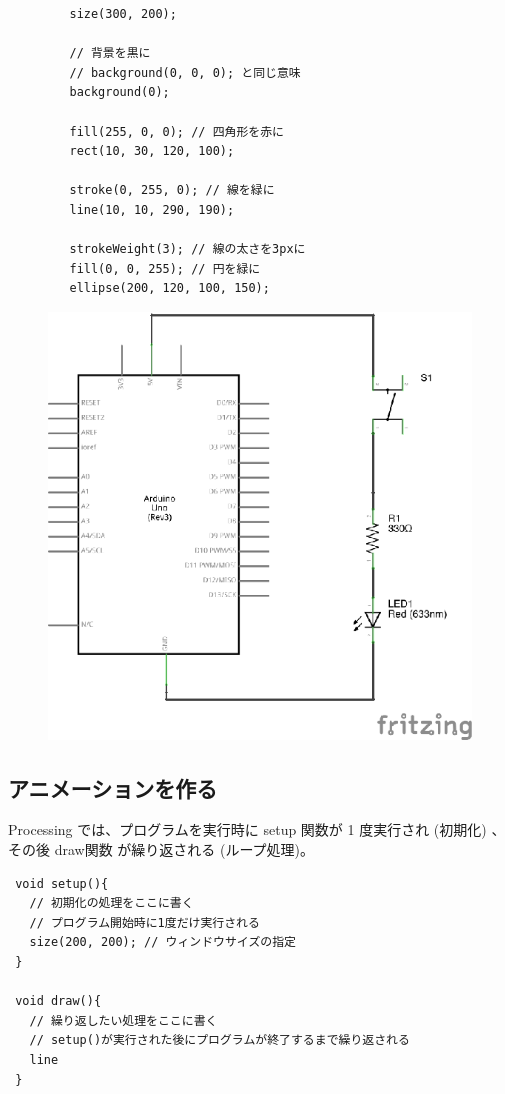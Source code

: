\documentclass[11pt,a4paper]{jarticle}
\begin{document}
\begin{figure}[h!]
 \begin{minipage}{0.65\columnwidth}
  \begin{lstlisting}
   size(300, 200);

   // 背景を黒に
   // background(0, 0, 0); と同じ意味
   background(0); 

   fill(255, 0, 0); // 四角形を赤に
   rect(10, 30, 120, 100);

   stroke(0, 255, 0); // 線を緑に
   line(10, 10, 290, 190);

   strokeWeight(3); // 線の太さを3pxに
   fill(0, 0, 255); // 円を緑に
   ellipse(200, 120, 100, 150);
  \end{lstlisting}
 \end{minipage}
 \begin{minipage}{0.35\columnwidth}
  \centering
  \includegraphics[width=0.5\columnwidth]{img/circuit01.eps}
 \end{minipage}
\end{figure}



\subsection*{アニメーションを作る}
Processing では、プログラムを実行時に setup 関数が 1 度実行され (初期化) 、その後 draw関数 が繰り返される (ループ処理)。

\begin{lstlisting}
 void setup(){
   // 初期化の処理をここに書く
   // プログラム開始時に1度だけ実行される
   size(200, 200); // ウィンドウサイズの指定
 }

 void draw(){
   // 繰り返したい処理をここに書く
   // setup()が実行された後にプログラムが終了するまで繰り返される
   line
 }
\end{lstlisting}
\end{document}
